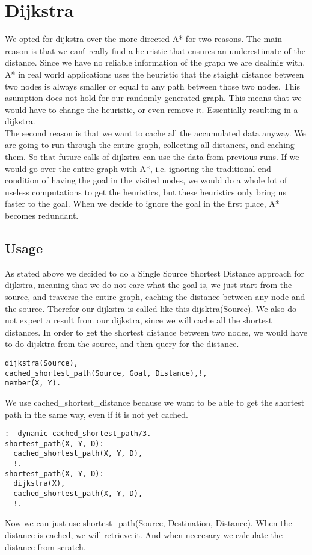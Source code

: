 \section{Dijkstra}
We opted for dijkstra over the more directed A* for two reasons. The main reason is that we can\'t really find a heuristic that ensures an underestimate of the distance. Since we have no reliable information of the graph we are dealinig with. A* in real world applications uses the heuristic that the staight distance between two nodes is always smaller or equal to any path between those two nodes. This asumption does not hold for our randomly generated graph. This means that we would have to change the heuristic, or even remove it. Essentially resulting in a dijkstra.\\
The second reason is that we want to cache all the accumulated data anyway. We are going to run through the entire graph, collecting all distances, and caching them. So that future calls of dijkstra can use the data from previous runs. If we would go over the entire graph with A*, i.e. ignoring the traditional end condition of having the goal in the visited nodes, we would do a whole lot of useless computations to get the heuristics, but these heuristics only bring us faster to the goal. When we decide to ignore the goal in the first place, A* becomes redundant.
\subsection{Usage}
	As stated above we decided to do a Single Source Shortest Distance approach for dijkstra, meaning that we do not care what the goal is, we just start from the source, and traverse the entire graph, caching the distance between any node and the source. Therefor our dijkstra is called like this
		dijsktra(Source).
	We also do not expect a result from our dijkstra, since we will cache all the shortest distances. In order to get the shortest distance between two nodes, we would have to do dijsktra from the source, and then query for the distance.
\begin{lstlisting}
dijkstra(Source),
cached_shortest_path(Source, Goal, Distance),!,
member(X, Y).
\end{lstlisting}
We use cached\_shortest\_distance because we want to be able to get the shortest path in the same way, even if it is not yet cached.
\begin{lstlisting}
:- dynamic cached_shortest_path/3.
shortest_path(X, Y, D):-
  cached_shortest_path(X, Y, D),
  !.
shortest_path(X, Y, D):-
  dijkstra(X),
  cached_shortest_path(X, Y, D),
  !.
\end{lstlisting}
Now we can just use shortest\_path(Source, Destination, Distance). When the distance is cached, we will retrieve it. And when neccesary we calculate the distance from scratch.

